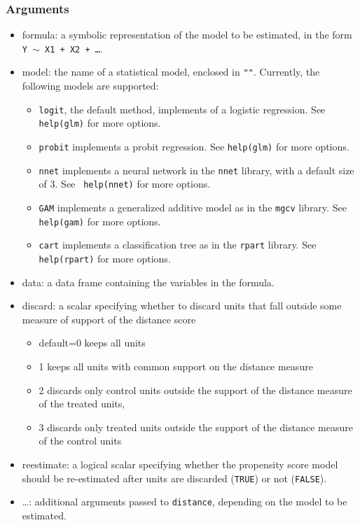 \documentclass[oneside,letterpaper,titlepage]{article}
\begin{document}
\begin{appendix}
\subsubsection{Arguments}
\begin{itemize}
\item{formula}: a symbolic representation of the model to be estimated,
  in the form {\tt Y $\sim$ X1 + X2 + \dots}.
\item{model}: the name of a statistical model, enclosed in {\tt ""}.
  Currently, the following models are supported:
  \begin{itemize}
  \item \texttt{logit}, the default method, implements of a logistic regression.  See
    {\tt help(glm)} for more options. 
  \item \texttt{probit} implements a probit regression.  See
    {\tt help(glm)} for more options. 
  \item \texttt{nnet} implements a neural network in the
    \texttt{nnet} library, with a default size of 3.  See {\tt
      help(nnet)} for more options.
  \item \texttt{GAM} implements a generalized additive model 
    as in the \texttt{mgcv} library.  See
    {\tt help(gam)} for more options.
  \item \texttt{cart} implements a classification tree as in the
    \texttt{rpart} library.  See {\tt help(rpart)} for more
    options.  
  \end{itemize}
\item{data}: a data frame containing the variables in the formula.
\item{discard}: a scalar specifying whether to discard units that
  fall outside some measure of support of the distance score
  \begin{itemize}
  \item default=0 keeps all units
  \item  1 keeps all units with common support on the distance
    measure
  \item 2 discards only control units outside the support of the
    distance measure of the treated units,
  \item 3 discards only treated units outside the support of 
    the distance measure of the control units
  \end{itemize}
\item{reestimate}: a logical scalar specifying whether the
  propensity score model should be re-estimated after units are
  discarded (\texttt{TRUE}) or not (\texttt{FALSE}).
\item{\dots}: additional arguments passed to \texttt{distance}, depending on
    the model to be estimated.
\end{itemize}


\end{appendix}
\end{document}
